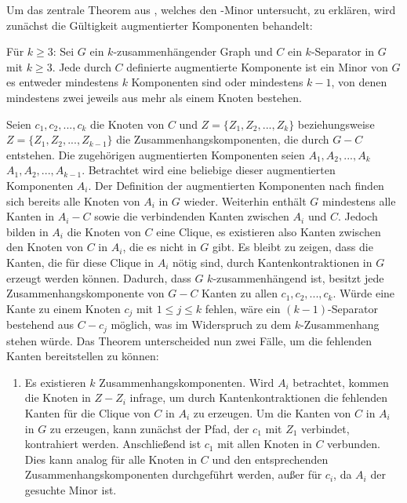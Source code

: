 Um das zentrale Theorem aus \cite{KeM92}, welches den \kdd-Minor untersucht, zu erklären, wird zunächst die Gültigkeit augmentierter Komponenten behandelt:
\begin{theorem}\label{eq:Theorem33}
  Für $k \geq 3$: Sei $G$ ein $k$-zusammenhängender Graph und $C$ ein $k$-Separator in $G$ mit $k \geq 3$.
  Jede durch $C$ definierte augmentierte Komponente ist ein Minor von $G$ \gdw es entweder mindestens $k$ Komponenten sind oder mindestens $k-1$, von denen mindestens zwei jeweils aus mehr als einem Knoten bestehen.
\end{theorem}
\begin{beweis}
  Seien $c_1, c_2, ..., c_k$ die Knoten von $C$ und $Z = \{Z_1, Z_2, ..., Z_k\}$ beziehungsweise $Z = \{Z_1, Z_2, ..., Z_{k-1}\}$ die Zusammenhangskomponenten, die durch $G - C$ entstehen.
  Die zugehörigen augmentierten Komponenten seien $A_1, A_2, ..., A_k$ \bzw $A_1, A_2, ..., A_{k-1}$.
  Betrachtet wird eine beliebige dieser augmentierten Komponenten $A_i$.
  Der Definition der augmentierten Komponenten nach finden sich bereits alle Knoten von $A_i$ in $G$ wieder. %
  Weiterhin enthält $G$ mindestens alle Kanten in $A_i - C$ sowie die verbindenden Kanten zwischen $A_i$ und $C$.
  Jedoch bilden in $A_i$ die Knoten von $C$ eine Clique, es existieren also \ggf Kanten zwischen den Knoten von $C$ in $A_i$, die es nicht in $G$ gibt.
  Es bleibt zu zeigen, dass die Kanten, die für diese Clique in $A_i$ nötig sind, durch Kantenkontraktionen in $G$ erzeugt werden können.
  Dadurch, dass $G$ $k$-zusammenhängend ist, besitzt jede Zusammenhangskomponente von $G - C$ Kanten zu allen $c_1, c_2, ..., c_k$.
  Würde eine Kante zu einem Knoten $c_j$ mit $1 \leq j \leq k$ fehlen, wäre ein $(k-1)$-Separator bestehend aus $C - c_j$ möglich, was im Widerspruch zu dem $k$-Zusammenhang stehen würde.
  Das Theorem unterscheided nun zwei Fälle, um die fehlenden Kanten bereitstellen zu können:
  \begin{enumerate}
    \item Es existieren $k$ Zusammenhangskomponenten.
          Wird $A_i$ betrachtet, kommen die Knoten in $Z - Z_i$ infrage, um durch Kantenkontraktionen die fehlenden Kanten für die Clique von $C$ in $A_i$ zu erzeugen.
          Um die Kanten von $C$ in $A_i$ in $G$ zu erzeugen, kann zunächst der Pfad, der $c_1$ mit $Z_1$ verbindet, kontrahiert werden.
          Anschließend ist $c_1$ mit allen Knoten in $C$ verbunden.
          Dies kann analog für alle Knoten in $C$ und den entsprechenden Zusammenhangskomponenten durchgeführt werden, außer für $c_i$, da $A_i$ der gesuchte Minor ist.

\end{enumerate}
\end{beweis}
